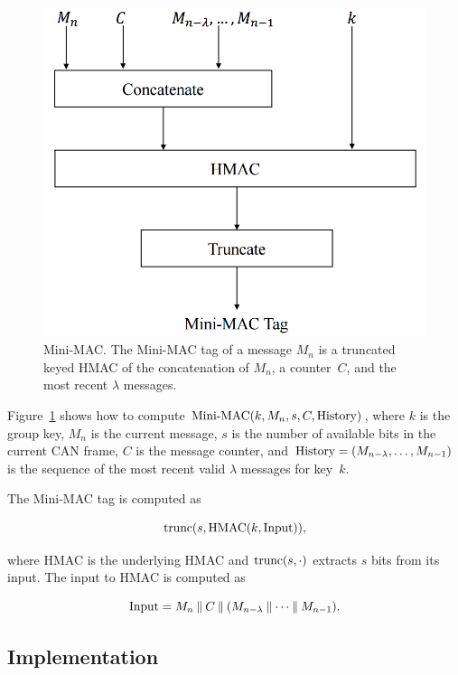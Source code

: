 	\begin{figure}
		\centering
		\includegraphics[width=\columnwidth]{figures/minimac_diagram.png}
		\caption{Mini-MAC. The Mini-MAC tag of a message $M_n$ is a truncated keyed HMAC of 
		the concatenation of $M_n$, a counter~$C$, and the most recent $\lambda$ messages.}
		\label{fig-minimac}
	\end{figure}

Figure~\ref{fig-minimac} shows how to compute 
$\hbox{Mini-MAC}(k,M_n,s,C,\hbox{History})$, 
where $k$ is the group key, 
$M_n$ is the current message, 
$s$ is the number of available bits in the current CAN frame, 
$C$ is the message counter, 
and $\hbox{History} = (M_{n-{\lambda}}, \ldots, M_{n-1})$ 
is the sequence of the most recent
valid $\lambda$ messages for key~$k$.

The Mini-MAC tag is computed as

\begin{equation}
\hbox{trunc(}s,\text{HMAC}(k,\text{Input})),
\end{equation}

\noindent where HMAC is the underlying HMAC and $\hbox{trunc}(s,\cdot)$
extracts $s$ bits from its input.  The input to HMAC is computed as

\begin{equation}
\text{Input} = M_n \mathbin{\|} C \mathbin{\|} (M_{n-{\lambda}} \mathbin{\|} \cdots \mathbin{\|} M_{n-1}) .
\end{equation}

\subsection{Implementation}
\label{implementation}

